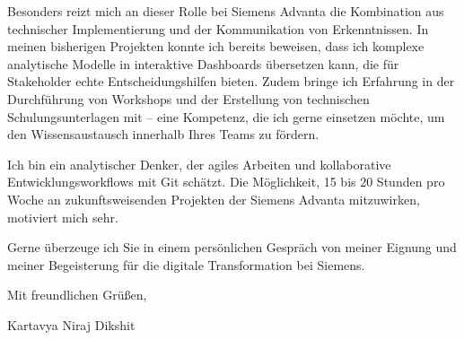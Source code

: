 \documentclass[10pt, a4paper]{article}
\begin{document}
Besonders reizt mich an dieser Rolle bei Siemens Advanta die Kombination aus technischer Implementierung und der Kommunikation von Erkenntnissen. In meinen bisherigen Projekten konnte ich bereits beweisen, dass ich komplexe analytische Modelle in interaktive Dashboards übersetzen kann, die für Stakeholder echte Entscheidungshilfen bieten. Zudem bringe ich Erfahrung in der Durchführung von Workshops und der Erstellung von technischen Schulungsunterlagen mit – eine Kompetenz, die ich gerne einsetzen möchte, um den Wissensaustausch innerhalb Ihres Teams zu fördern.

Ich bin ein analytischer Denker, der agiles Arbeiten und kollaborative Entwicklungsworkflows mit Git schätzt. Die Möglichkeit, 15 bis 20 Stunden pro Woche an zukunftsweisenden Projekten der Siemens Advanta mitzuwirken, motiviert mich sehr. 

Gerne überzeuge ich Sie in einem persönlichen Gespräch von meiner Eignung und meiner Begeisterung für die digitale Transformation bei Siemens.

Mit freundlichen Grüßen,

\vspace{20pt}
Kartavya Niraj Dikshit
\end{document}
